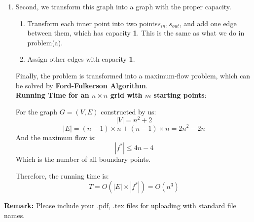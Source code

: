\documentclass[12pt,a4paper]{article}
\makeatletter
\newtheorem*{solution}{Solution}
\theoremstyle{definition}
\renewenvironment{solution}[1][Solution] {\par\pushQED{\qed}\normalfont\topsep6\p@\@plus6\p@\relax\trivlist\item[\hskip\labelsep\bfseries#1\@addpunct{.}]\ignorespaces}{\popQED\endtrivlist\@endpefalse} \makeatother
\makeatother
\begin{document}
\begin{enumerate}
\begin{enumerate}
\begin{solution}
         Second, we transform this graph into a graph with the proper capacity.
    
    \begin{enumerate}
        \item Transform each inner point into two points$s_{in},s_{out}$, and add one edge between them, which has capacity \textbf{1}. This is the same as what we do in problem(a).
        \item Assign  other edges with capacity \textbf{1}.
    \end{enumerate}
    
    Finally, the problem is transformed into a maximum-flow problem, which can be solved by \textbf{Ford-Fulkerson Algorithm}.
    ~\\
    
    \textbf{Running Time for an $n\times n$ grid with $m$ starting points}:
    
    For the graph $G=(V,E)$ constructed by us:
    $$
    |V| = n^2 + 2
    $$
    $$
    |E| = (n-1)\times n + (n-1)\times n = 2n^2 - 2n
    $$
    And the maximum flow is:
    $$
    |f^*|\leq 4n-4
    $$
    Which is the number of all boundary points.
    
    Therefore, the running time is:
    $$
    T=O(|E|\times|f^*|)=O(n^3)
    $$
    
    
    
        \end{solution}
    \end{enumerate}
    
   
\end{enumerate}

\textbf{Remark:} Please include your .pdf, .tex files for uploading with standard file names.
\newpage


\end{document}
